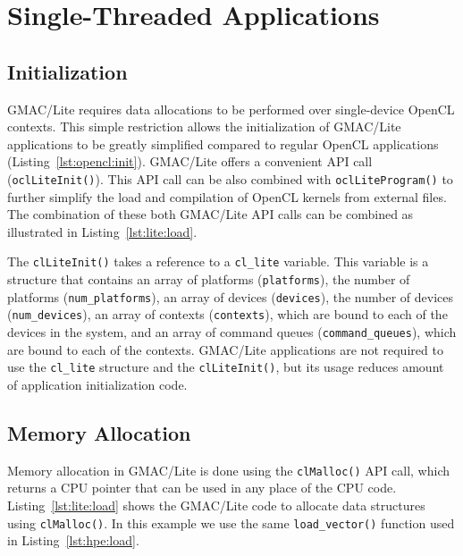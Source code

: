 \section{Single\hyp{}Threaded Applications}

\subsection{Initialization}
GMAC\slash Lite requires data allocations to be performed over single\hyp{}device OpenCL contexts.  
This simple restriction allows the initialization of GMAC\slash Lite applications to be greatly 
simplified compared to regular OpenCL applications (Listing~\ref{lst:opencl:init}). GMAC\slash Lite 
offers a convenient API call (\texttt{oclLiteInit()}). This API call can be also combined with 
\texttt{oclLiteProgram()} to further simplify the load and compilation of OpenCL kernels from 
external files. The combination of these both GMAC\slash Lite API calls can be combined as 
illustrated in Listing~\ref{lst:lite:load}.



The \texttt{clLiteInit()} takes a reference to a \texttt{cl\_lite} variable. This variable is a 
structure that contains an array of platforms (\texttt{platforms}), the number of platforms 
(\texttt{num\_platforms}), an array of devices (\texttt{devices}), the number of devices 
(\texttt{num\_devices}), an array of contexts (\texttt{contexts}), which are bound to each of the 
devices in the system, and an array of command queues (\texttt{command\_queues}), which are bound to 
each of the contexts. GMAC\slash Lite applications are not required to use the \texttt{cl\_lite} 
structure and the \texttt{clLiteInit()}, but its usage reduces amount of application initialization 
code.

\subsection{Memory Allocation}
Memory allocation in GMAC\slash Lite is done using the \texttt{clMalloc()} API call, which returns a 
CPU pointer that can be used in any place of the CPU code. Listing~\ref{lst:lite:load} shows the 
GMAC\slash Lite code to allocate data structures using \texttt{clMalloc()}. In this example we use 
the same \texttt{load\_vector()} function used in Listing~\ref{lst:hpe:load}.

